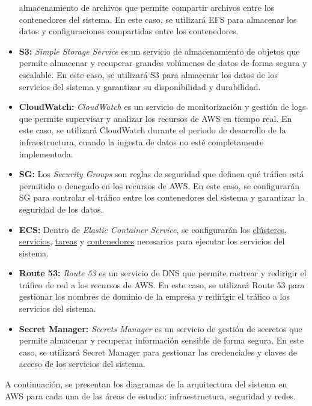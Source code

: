 \begin{itemize}
		almacenamiento de archivos que permite compartir archivos entre los
		contenedores del sistema. En este caso, se utilizará EFS para almacenar
		los datos y configuraciones compartidas entre los contenedores.
	\item \textbf{S3:} \textit{Simple Storage Service} es un servicio de
		almacenamiento de objetos que permite almacenar y recuperar grandes
		volúmenes de datos de forma segura y escalable. En este caso, se
		utilizará S3 para almacenar los datos de los servicios del sistema y
		garantizar su disponibilidad y durabilidad.
	\item \textbf{CloudWatch:} \textit{CloudWatch} es un servicio de
		monitorización y gestión de logs que permite supervisar y analizar los
		recursos de AWS en tiempo real. En este caso, se utilizará CloudWatch
		durante el periodo de desarrollo de la infraestructura, cuando la
		ingesta de datos no esté completamente implementada.
	\item \textbf{SG:} Los \textit{Security Groups} son reglas de seguridad que
		definen qué tráfico está permitido o denegado en los recursos de AWS.
		En este caso, se configurarán SG para controlar el tráfico entre los
		contenedores del sistema y garantizar la seguridad de los datos.
	\item \textbf{ECS:} Dentro de \textit{Elastic Container Service}, se
		configurarán los \underline{clústeres}, \underline{servicios},
		\underline{tareas} y \underline{contenedores} necesarios para
		ejecutar los servicios del sistema.
	\item \textbf{Route 53:} \textit{Route 53} es un servicio de DNS que permite
		rastrear y redirigir el tráfico de red a los recursos de AWS. En este
		caso, se utilizará Route 53 para gestionar los nombres de dominio de la
		empresa y redirigir el tráfico a los servicios del sistema.
	\item \textbf{Secret Manager:} \textit{Secrets Manager} es un servicio de
		gestión de secretos que permite almacenar y recuperar información
		sensible de forma segura. En este caso, se utilizará Secret Manager para
		gestionar las credenciales y claves de acceso de los servicios del
		sistema.
\end{itemize}

A continuación, se presentan los diagramas de la arquitectura del sistema en AWS
para cada una de las áreas de estudio: infraestructura, seguridad y redes.


\newpage{}
